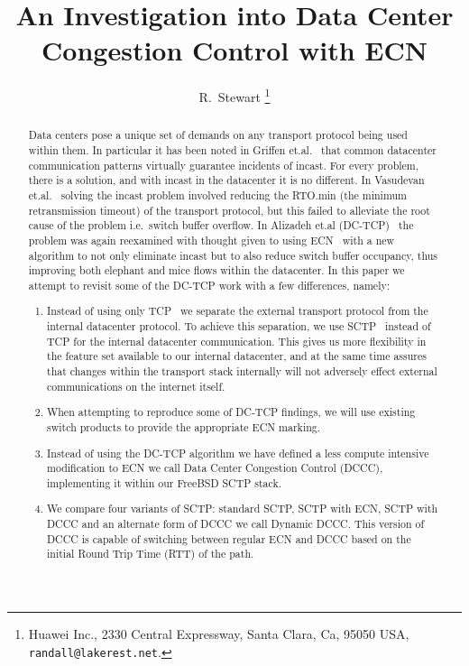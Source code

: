 \documentclass[12pt]{article}
\begin{document}
%
%
\title{An Investigation into Data Center Congestion Control with ECN}
\author{R.~Stewart%
        \thanks{Huawei Inc.,
                2330 Central Expressway,
                Santa Clara, Ca, 95050
                USA,
                \texttt{randall@lakerest.net}.}
}

\maketitle


\begin{abstract}
Data centers pose a unique set of demands on any transport protocol being used
within them. In particular it has been noted in Griffen et.al.~\cite{griffen} that common datacenter
communication patterns virtually guarantee incidents of incast. For every problem, there is a solution,
and with incast in the datacenter it is no different. In Vasudevan et.al.~\cite{vasudevan} solving the incast
problem involved reducing the RTO.min (the minimum retransmission timeout) of the transport protocol, but
this failed to alleviate the root cause of the problem i.e.~switch buffer overflow. In Alizadeh et.al (DC-TCP)~\cite{alizadeh} the problem
was again reexamined with thought given to using ECN~\cite{rfc3168}  with a new algorithm to not only eliminate
incast but to also reduce switch buffer occupancy, thus improving both elephant and mice flows
within the datacenter. In this paper we attempt to revisit some of the DC-TCP  work with a few differences, namely:

\begin{enumerate}
 \item  Instead of using only TCP~\cite{rfc793} we separate the external transport protocol from the internal datacenter protocol.
 To achieve this separation, we use SCTP~\cite{rfc4960} instead of TCP for the internal datacenter communication. This gives us more flexibility in the feature set available to our internal datacenter, and at the same
 time assures that changes within the transport stack internally will not adversely effect external communications on
 the internet itself.
\item  When attempting to reproduce some of DC-TCP findings, we will use existing switch products
to provide the appropriate ECN marking.
\item Instead of using the DC-TCP algorithm we have defined a less compute intensive modification
to ECN we call Data Center Congestion Control (DCCC), implementing it within our FreeBSD SCTP stack.
\item We compare four variants of SCTP: standard SCTP, SCTP with ECN, SCTP with DCCC and an alternate
form of DCCC we call Dynamic DCCC. This version of DCCC is capable of switching between regular ECN
and DCCC based on the initial Round Trip Time (RTT) of the path. 
\end{enumerate}

\end{abstract}
\end{document}
